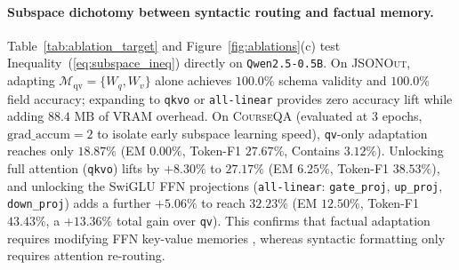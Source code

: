 \documentclass[10pt,a4paper,twocolumn]{article}
\begin{document}
\paragraph{Subspace dichotomy between syntactic routing and factual memory.}
Table~\ref{tab:ablation_target} and Figure~\ref{fig:ablations}(c) test Inequality~(\ref{eq:subspace_ineq}) directly on \texttt{Qwen2.5-0.5B}. On \textsc{JSONOut}, adapting $\mathcal{M}_{\text{qv}} = \{W_q, W_v\}$ alone achieves $100.0\%$ schema validity and $100.0\%$ field accuracy; expanding to \texttt{qkvo} or \texttt{all-linear} provides zero accuracy lift while adding $88.4\text{ MB}$ of VRAM overhead. On \textsc{CourseQA} (evaluated at 3 epochs, $\text{grad\_accum}=2$ to isolate early subspace learning speed), \texttt{qv}-only adaptation reaches only $18.87\%$  (EM $0.00\%$, Token-F1 $27.67\%$, Contains $3.12\%$). Unlocking full attention (\texttt{qkvo}) lifts  by $+8.30\%$ to $27.17\%$ (EM $6.25\%$, Token-F1 $38.53\%$), and unlocking the SwiGLU FFN projections (\texttt{all-linear}: \texttt{gate\_proj}, \texttt{up\_proj}, \texttt{down\_proj}) adds a further $+5.06\%$ to reach $32.23\%$ (EM $12.50\%$, Token-F1 $43.43\%$, a $+13.36\%$ total gain over \texttt{qv}). This confirms that factual adaptation requires modifying FFN key-value memories \citep{geva2021transformer}, whereas syntactic formatting only requires attention re-routing.

\begin{table}[t]
\centering
{}
\caption{\textbf{Preference alignment stability on \texttt{Qwen2.5-0.5B}} (\textsc{Intent}, $n=192$ test queries) across DPO step sizes vs.\ Zero-Shot and Supervised LoRA.}
\label{tab:dpo}
\end{table}
\end{document}
